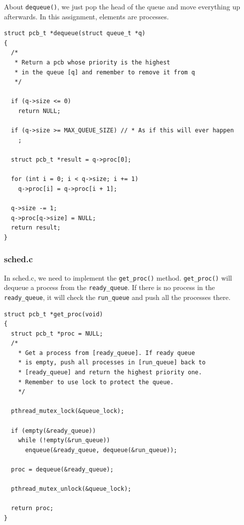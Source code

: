 \documentclass[a4paper]{article}
\numberwithin{equation}{section}
\begin{document}
About \texttt{dequeue()}, we just pop the head of the queue and move everything up afterwards.
In this assignment, elements are processes.
\begin{mdframed}[leftline=false,rightline=false,backgroundcolor=magenta!10,nobreak=false]
  \begin{verbatim}
struct pcb_t *dequeue(struct queue_t *q)
{
  /*
   * Return a pcb whose priority is the highest
   * in the queue [q] and remember to remove it from q
   */

  if (q->size <= 0)
    return NULL;

  if (q->size >= MAX_QUEUE_SIZE) // * As if this will ever happen
    ;

  struct pcb_t *result = q->proc[0];

  for (int i = 0; i < q->size; i += 1)
    q->proc[i] = q->proc[i + 1];

  q->size -= 1;
  q->proc[q->size] = NULL;
  return result;
}
  \end{verbatim}
\end{mdframed}

\subsubsection{sched.c}
In sched.c, we need to implement the \texttt{get_proc()} method.
\texttt{get_proc()} will dequeue a process from the \texttt{ready_queue}.
If there is no process in the \texttt{ready_queue}, it will check the \texttt{run_queue} and push all the processes there.
\begin{mdframed}[leftline=false,rightline=false,backgroundcolor=magenta!10,nobreak=false]
  \begin{verbatim}
struct pcb_t *get_proc(void)
{
  struct pcb_t *proc = NULL;
  /*
    * Get a process from [ready_queue]. If ready queue
    * is empty, push all processes in [run_queue] back to
    * [ready_queue] and return the highest priority one.
    * Remember to use lock to protect the queue.
    */

  pthread_mutex_lock(&queue_lock);

  if (empty(&ready_queue))
    while (!empty(&run_queue))
      enqueue(&ready_queue, dequeue(&run_queue));

  proc = dequeue(&ready_queue);

  pthread_mutex_unlock(&queue_lock);

  return proc;
}
  \end{verbatim}
\end{mdframed}
\end{document}
